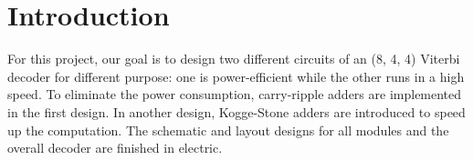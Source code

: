 \documentclass[conference]{IEEEtran}
\begin{document}
\begin{abstract}
This paper presents the basic knowledge and circuit design for an (8, 4, 4) Viterbi decoder. Two different designs are given to optimize either computation speed or power consumption. The decoder architecture is verified by logic simulation in Modelsim with Verilog. Timing analysis and circuit simulation in IRSIM and SPICE are done to find the computation delay and the amount of power consumed for both designs. The repository and \LaTeX\  code for this report can be accessed by visiting: \url{https://github.com/xiaoqing1993/ECSE548_viterbi_decoder}

\end{abstract}







%
\IEEEpeerreviewmaketitle



\section{Introduction}
For this project, our goal is to design two different circuits of an (8, 4, 4) Viterbi decoder for different purpose: one is power-efficient while the other runs in a high speed. To eliminate the power consumption, carry-ripple adders are implemented in the first design. In another design, Kogge-Stone adders are introduced to speed up the computation. The schematic and layout designs for all modules and the overall decoder are finished in electric.
\end{document}
